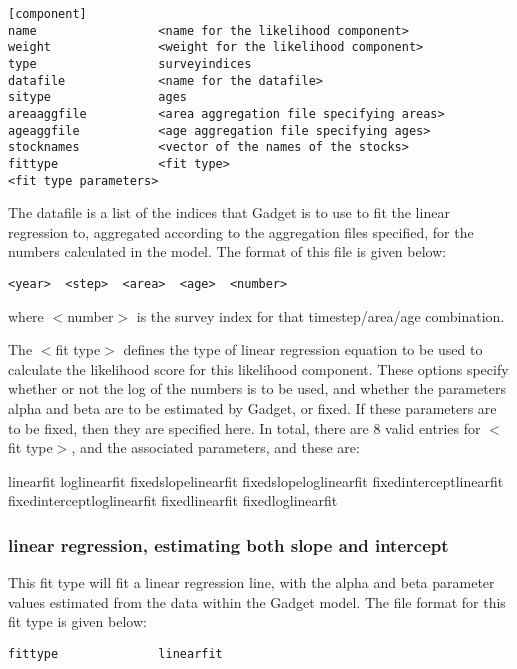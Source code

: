 \documentclass [a4paper, 10pt]{book}
\begin{document}
{\small\begin{verbatim}
[component]
name                 <name for the likelihood component>
weight               <weight for the likelihood component>
type                 surveyindices
datafile             <name for the datafile>
sitype               ages
areaaggfile          <area aggregation file specifying areas>
ageaggfile           <age aggregation file specifying ages>
stocknames           <vector of the names of the stocks>
fittype              <fit type>
<fit type parameters>
\end{verbatim}}

The datafile is a list of the indices that Gadget is to use to fit the linear regression to, aggregated according to the aggregation files specified, for the numbers calculated in the model.  The format of this file is given below:

{\small\begin{verbatim}
<year>  <step>  <area>  <age>  <number>
\end{verbatim}}

where $<$number$>$ is the survey index for that timestep/area/age combination.

\bigskip
The $<$fit type$>$ defines the type of linear regression equation to be used to calculate the likelihood score for this likelihood component.  These options specify whether or not the log of the numbers is to be used, and whether the parameters alpha and beta are to be estimated by Gadget, or fixed.  If these parameters are to be fixed, then they are specified here.  In total, there are 8 valid entries for $<$fit type$>$, and the associated parameters, and these are:

\bigskip
linearfit\newline
loglinearfit\newline
fixedslopelinearfit\newline
fixedslopeloglinearfit\newline
fixedinterceptlinearfit\newline
fixedinterceptloglinearfit\newline
fixedlinearfit\newline
fixedloglinearfit

\subsubsection{linear regression, estimating both slope and intercept}
This fit type will fit a linear regression line, with the alpha and beta parameter values estimated from the data within the Gadget model.  The file format for this fit type is given below:
{\small\begin{verbatim}
fittype              linearfit
\end{verbatim}}
\end{document}
